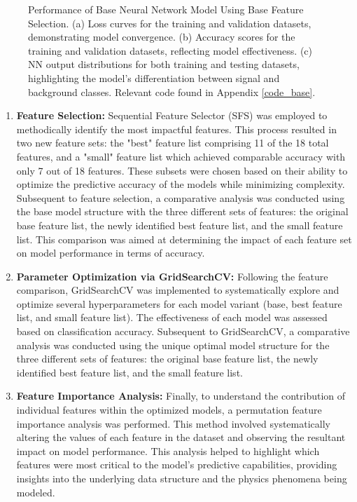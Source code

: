\documentclass[]{article}
\begin{document}
\begin{figure}[ht]
	\caption{Performance of Base Neural Network Model Using Base Feature Selection. (a) Loss curves for the training and validation datasets, demonstrating model convergence. (b) Accuracy scores for the training and validation datasets, reflecting model effectiveness. (c) NN output distributions for both training and testing datasets, highlighting the model's differentiation between signal and background classes. Relevant code found in Appendix \ref{code_base}.}
	\label{fig:base_model_plots}
\end{figure}


\begin{enumerate}
\item \textbf{Feature Selection:}
 Sequential Feature Selector (SFS) was employed to methodically identify the most impactful features. This process resulted in two new feature sets: the "best" feature list comprising 11 of the 18 total features, and a "small" feature list which achieved comparable accuracy with only 7 out of 18 features. These subsets were chosen based on their ability to optimize the predictive accuracy of the models while minimizing complexity. Subsequent to feature selection, a comparative analysis was conducted using the base model structure with the three different sets of features: the original base feature list, the newly identified best feature list, and the small feature list. This comparison was aimed at determining the impact of each feature set on model performance in terms of accuracy.

\item \textbf{Parameter Optimization via GridSearchCV:}
Following the feature comparison, GridSearchCV was implemented to systematically explore and optimize several hyperparameters for each model variant (base, best feature list, and small feature list). The effectiveness of each model was assessed based on classification accuracy. Subsequent to GridSearchCV, a comparative analysis was conducted using the unique optimal model structure for the three different sets of features: the original base feature list, the newly identified best feature list, and the small feature list.

\item \textbf{Feature Importance Analysis:}
Finally, to understand the contribution of individual features within the optimized models, a permutation feature importance analysis was performed. This method involved systematically altering the values of each feature in the dataset and observing the resultant impact on model performance. This analysis helped to highlight which features were most critical to the model’s predictive capabilities, providing insights into the underlying data structure and the physics phenomena being modeled.
\end{enumerate}
\end{document}
